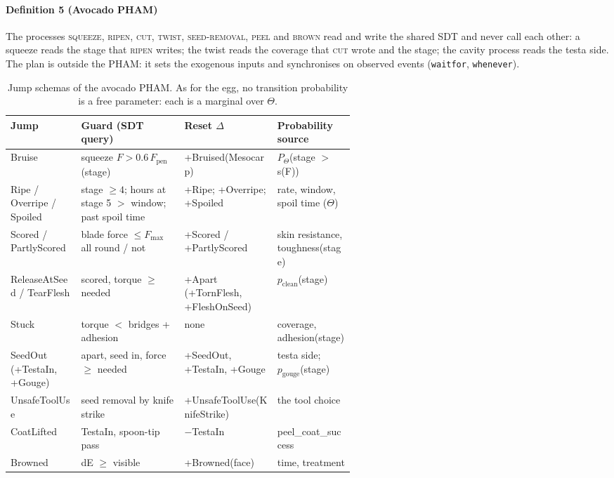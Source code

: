 \documentclass[10.5pt,a4paper]{article}
\begin{document}
\paragraph{Definition 5 (Avocado PHAM)} The processes \textsc{squeeze}, \textsc{ripen}, \textsc{cut},
\textsc{twist}, \textsc{seed-removal}, \textsc{peel} and \textsc{brown} read and write the shared SDT and never call
each other: a squeeze reads the stage that \textsc{ripen} writes; the twist reads the coverage that \textsc{cut}
wrote and the stage; the cavity process reads the testa side. The plan is outside the PHAM: it sets the exogenous
inputs and synchronises on observed events (\texttt{waitfor}, \texttt{whenever}).
\begin{table}[htbp]\centering\scriptsize\caption{Jump schemas of the avocado PHAM. As for the egg, no transition probability is a free parameter: each is a marginal over $\Theta$.\label{tab:jumps}}
\begin{tabularx}{\linewidth}{@{}lp{0.3\linewidth}p{0.27\linewidth}X@{}}\toprule Jump & Guard (SDT query) & Reset $\Delta$ & Probability source \\\midrule
Bruise & squeeze $F > 0.6\,F_\text{pen}$(stage) & +Bruised(Mesocarp) & $P_\Theta$(stage $>$ s(F)) \\
Ripe / Overripe / Spoiled & stage $\ge 4$; hours at stage 5 $>$ window; past spoil time & +Ripe; +Overripe; +Spoiled & rate, window, spoil time ($\Theta$) \\
Scored / PartlyScored & blade force $\le F_\text{max}$ all round / not & +Scored / +PartlyScored & skin resistance, toughness(stage) \\
ReleaseAtSeed / TearFlesh & scored, torque $\ge$ needed & +Apart (+TornFlesh, +FleshOnSeed) & $p_\text{clean}$(stage) \\
Stuck & torque $<$ bridges + adhesion & none & coverage, adhesion(stage) \\
SeedOut (+TestaIn, +Gouge) & apart, seed in, force $\ge$ needed & +SeedOut, +TestaIn, +Gouge & testa side; $p_\text{gouge}$(stage) \\
UnsafeToolUse & seed removal by knife strike & +UnsafeToolUse(KnifeStrike) & the tool choice \\
CoatLifted & TestaIn, spoon-tip pass & $-$TestaIn & peel\_coat\_success \\
Browned & dE $\ge$ visible & +Browned(face) & time, treatment \\\bottomrule\end{tabularx}\end{table}
\end{document}
